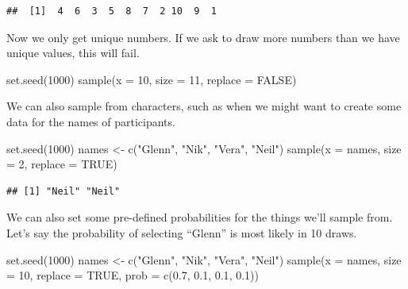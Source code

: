 \documentclass[
]{book}
\newenvironment{Shaded}{\begin{snugshade}}{\end{snugshade}}
\newcommand{\AttributeTok}[1]{\textcolor[rgb]{0.77,0.63,0.00}{#1}}
\newcommand{\ConstantTok}[1]{\textcolor[rgb]{0.00,0.00,0.00}{#1}}
\newcommand{\DecValTok}[1]{\textcolor[rgb]{0.00,0.00,0.81}{#1}}
\newcommand{\FloatTok}[1]{\textcolor[rgb]{0.00,0.00,0.81}{#1}}
\newcommand{\FunctionTok}[1]{\textcolor[rgb]{0.00,0.00,0.00}{#1}}
\newcommand{\NormalTok}[1]{#1}
\newcommand{\OtherTok}[1]{\textcolor[rgb]{0.56,0.35,0.01}{#1}}
\newcommand{\StringTok}[1]{\textcolor[rgb]{0.31,0.60,0.02}{#1}}
\begin{document}
\begin{verbatim}
##  [1]  4  6  3  5  8  7  2 10  9  1
\end{verbatim}

Now we only get unique numbers. If we ask to draw more numbers than we have unique values, this will fail.

\begin{Shaded}
\begin{Highlighting}[]
\FunctionTok{set.seed}\NormalTok{(}\DecValTok{1000}\NormalTok{)}
\FunctionTok{sample}\NormalTok{(}\AttributeTok{x =} \DecValTok{10}\NormalTok{, }\AttributeTok{size =} \DecValTok{11}\NormalTok{, }\AttributeTok{replace =} \ConstantTok{FALSE}\NormalTok{)}
\end{Highlighting}
\end{Shaded}

We can also sample from characters, such as when we might want to create some data for the names of participants.

\begin{Shaded}
\begin{Highlighting}[]
\FunctionTok{set.seed}\NormalTok{(}\DecValTok{1000}\NormalTok{)}
\NormalTok{names }\OtherTok{\textless{}{-}} \FunctionTok{c}\NormalTok{(}\StringTok{"Glenn"}\NormalTok{, }\StringTok{"Nik"}\NormalTok{, }\StringTok{"Vera"}\NormalTok{, }\StringTok{"Neil"}\NormalTok{)}
\FunctionTok{sample}\NormalTok{(}\AttributeTok{x =}\NormalTok{ names, }\AttributeTok{size =} \DecValTok{2}\NormalTok{, }\AttributeTok{replace =} \ConstantTok{TRUE}\NormalTok{)}
\end{Highlighting}
\end{Shaded}

\begin{verbatim}
## [1] "Neil" "Neil"
\end{verbatim}

We can also set some pre-defined probabilities for the things we'll sample from. Let's say the probability of selecting ``Glenn'' is most likely in 10 draws.

\begin{Shaded}
\begin{Highlighting}[]
\FunctionTok{set.seed}\NormalTok{(}\DecValTok{1000}\NormalTok{)}
\NormalTok{names }\OtherTok{\textless{}{-}} \FunctionTok{c}\NormalTok{(}\StringTok{"Glenn"}\NormalTok{, }\StringTok{"Nik"}\NormalTok{, }\StringTok{"Vera"}\NormalTok{, }\StringTok{"Neil"}\NormalTok{)}
\FunctionTok{sample}\NormalTok{(}\AttributeTok{x =}\NormalTok{ names, }\AttributeTok{size =} \DecValTok{10}\NormalTok{, }\AttributeTok{replace =} \ConstantTok{TRUE}\NormalTok{, }\AttributeTok{prob =} \FunctionTok{c}\NormalTok{(}\FloatTok{0.7}\NormalTok{, }\FloatTok{0.1}\NormalTok{, }\FloatTok{0.1}\NormalTok{, }\FloatTok{0.1}\NormalTok{))}
\end{Highlighting}
\end{Shaded}
\end{document}

